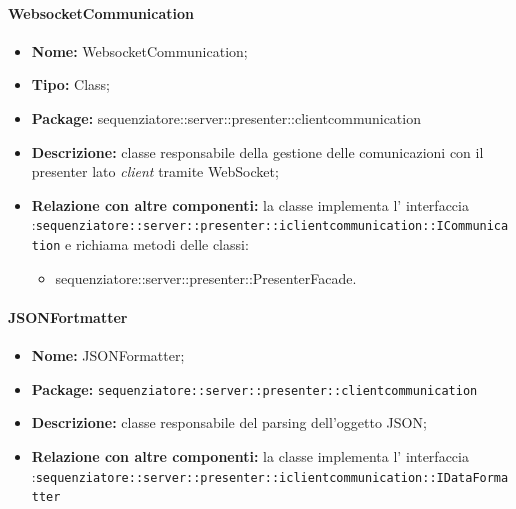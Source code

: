 \paragraph{WebsocketCommunication}
	\begin{itemize}
		\item \textbf{Nome:} WebsocketCommunication;
		\item \textbf{Tipo:} Class;
		\item \textbf{Package:} sequenziatore::server::presenter::clientcommunication
		\item \textbf{Descrizione:} classe responsabile della gestione delle comunicazioni con il presenter lato \textit{client} tramite WebSocket;
		\item \textbf{Relazione con altre componenti:} la classe implementa l' interfaccia :\texttt{sequenziatore::server::presenter::iclientcommunication::ICommunication} e richiama metodi delle classi:
		\begin{itemize}
			\item sequenziatore::server::presenter::PresenterFacade.
		\end{itemize}
	\end{itemize}
\paragraph{JSONFortmatter}
	\begin{itemize}
		\item \textbf{Nome:} JSONFormatter;
		\item \textbf{Package:} \texttt{sequenziatore::server::presenter::clientcommunication}
		\item \textbf{Descrizione:} classe responsabile del parsing dell'oggetto JSON;
		\item \textbf{Relazione con altre componenti:} la classe implementa l' interfaccia :\texttt{sequenziatore::server::presenter::iclientcommunication::IDataFormatter}
	\end{itemize}